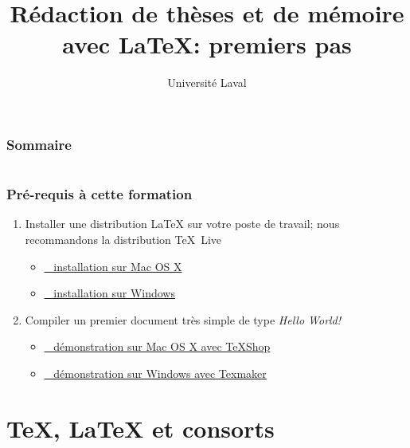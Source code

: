 \documentclass[aspectratio=54,10pt,xcolor=x11names]{beamer}
\title[]{Rédaction de thèses et de mémoire avec {\LaTeX}: premiers pas}
\author[]{Université Laval}
\date{}
\newcommand{\capsule}[2]{\href{#1}{\faYoutubePlay~#2}}
\theoremstyle{example}
\begin{document}




\begin{frame}
  \frametitle{Sommaire}
  \small
  \begin{columns}[t]
    \begin{column}{.5\textwidth}
      \tableofcontents[sections={1-5},hideallsubsections]
    \end{column}
    \begin{column}{.5\textwidth}
      \tableofcontents[sections={6-9},hideallsubsections]
    \end{column}
  \end{columns}
\end{frame}

\begin{frame}
  \frametitle{Pré-requis à cette formation}
  \begin{enumerate}
  \item Installer une distribution {\LaTeX} sur votre poste de
    travail; nous recommandons la distribution {\TeX}~Live
    \begin{itemize}
    \item[] \capsule{https://www.youtube.com/watch?v=fjcR6lFy0c4}{%
        installation sur Mac OS X}
    \item[] \capsule{https://www.youtube.com/watch?v=z_dq3dns-WU}{%
        installation sur Windows}
    \end{itemize}
    \bigskip
  \item Compiler un premier document très simple de type \emph{Hello World!}
    \begin{itemize}
    \item[] \capsule{https://www.youtube.com/watch?v=QOUx_aOZ42o}{%
        démonstration sur Mac OS X avec TeXShop}
    \item[] \capsule{https://www.youtube.com/watch?v=qddRMGwXnNM}{%
        démonstration sur Windows avec Texmaker}
    \end{itemize}
  \end{enumerate}
\end{frame}


\section{{\TeX}, {\LaTeX} et consorts}
\end{document}
